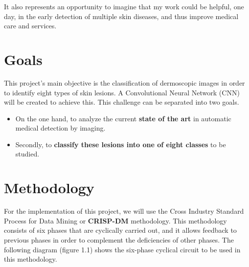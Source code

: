 It also represents an opportunity to imagine that my work could be helpful, one day, in the early detection of multiple skin diseases, and thus improve medical care and services.



\section{Goals}


This project's main objective is the classification of dermoscopic images in order to identify eight types of skin lesions. A Convolutional Neural Network (CNN) will be created to achieve this. This challenge can be separated into two goals.

\begin{itemize}
    \item On the one hand, to analyze the current \textbf{state of the art} in automatic medical detection by imaging.
    \item Secondly, to \textbf{classify these lesions into one of eight classes} to be studied.
\end{itemize}

\section{Methodology}


For the implementation of this project, we will use the Cross Industry Standard Process for Data Mining or \textbf{CRISP-DM} methodology. This methodology consists of six phases that are cyclically carried out, and it allows feedback to previous phases in order to complement the deficiencies of other phases. The following diagram (figure 1.1) shows the six-phase cyclical circuit to be used in this methodology.

